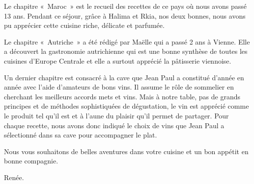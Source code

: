 Le chapitre « Maroc » est le recueil des recettes de ce pays où nous avons passé 13 ans. Pendant ce séjour, grâce à Halima et Rkia, nos deux bonnes, nous avons pu apprécier cette cuisine riche, délicate et parfumée.

Le chapitre « Autriche » a été rédigé par Maëlle qui a passé 2 ans à Vienne. Elle a découvert la gastronomie autrichienne qui est une bonne synthèse de toutes les cuisines d’Europe Centrale et elle a surtout apprécié la pâtisserie viennoise.

Un dernier chapitre est consacré à la cave que Jean Paul a constitué d’année en année avec l’aide d’amateurs de bons vins. Il assume le rôle de sommelier en cherchant les meilleurs accords mets et vins. Mais à notre table, pas de grands principes et de méthodes sophistiquées de dégustation, le vin est apprécié comme le produit tel qu’il est et à l’aune du plaisir qu’il permet de partager. Pour chaque recette, nous avons donc indiqué le choix de vins que Jean Paul a sélectionné dans sa cave pour accompagner le plat.

Nous vous souhaitons de belles aventures dans votre cuisine et un bon appétit en bonne compagnie.

\vspace{16pt}
\hfill
\parbox{2cm}{
Renée.
}
